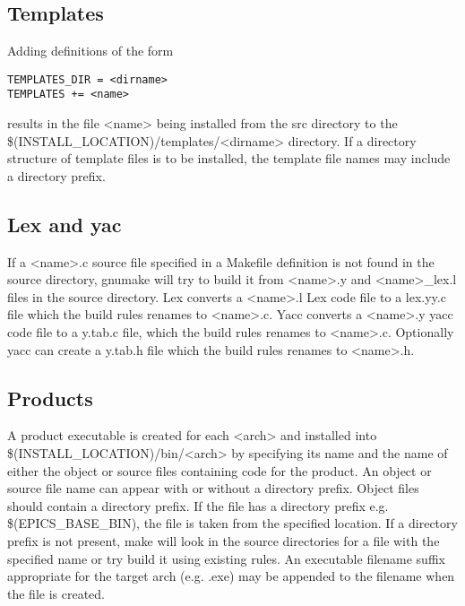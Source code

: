 \subsection{Templates}

Adding definitions of the form

\begin{verbatim}TEMPLATES_DIR = <dirname>
TEMPLATES += <name>
\end{verbatim}results in the file \textless{}name\textgreater{} being installed from the src directory to the \$(INSTALL\_LOCATION)/templates/\textless{}dirname\textgreater{} 
directory. If a directory structure of template files is to be installed, the template file names may include a directory prefix.

\subsection{Lex and yac}

If a \textless{}name\textgreater{}.c source file specified in a Makefile definition is not found in the source directory, gnumake will try to build 
it from \textless{}name\textgreater{}.y and \textless{}name\textgreater{}\_lex.l files in the source directory. Lex converts a \textless{}name\textgreater{}.l Lex code file to a lex.yy.c file 
which the build rules renames to \textless{}name\textgreater{}.c. Yacc converts a \textless{}name\textgreater{}.y yacc code file to a y.tab.c file, which the build 
rules renames to \textless{}name\textgreater{}.c. Optionally yacc can create a y.tab.h file which the build rules renames to \textless{}name\textgreater{}.h.

\subsection{Products}

A product executable is created for each \textless{}arch\textgreater{} and installed into \$(INSTALL\_LOCATION)/bin/\textless{}arch\textgreater{} by specifying its 
name and the name of either the object or source files containing code for the product. An object or source file name can 
appear with or without a directory prefix. Object files should contain a directory prefix. If the file has a directory prefix 
e.g. \$(EPICS\_BASE\_BIN), the file is taken from the specified location. If a directory prefix is not present, make will look 
in the source directories for a file with the specified name or try build it using existing rules. An executable filename 
suffix appropriate for the target arch (e.g. .exe) may be appended to the filename when the file is created.

